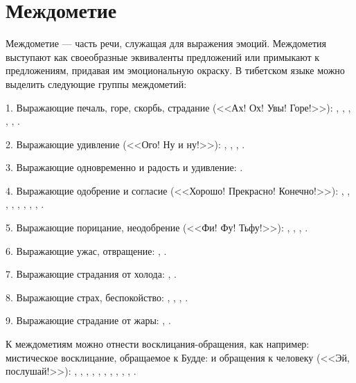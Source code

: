 \section{Междометие}

Междометие --- часть речи, служащая для выражения эмоций. Междометия выступают как своеобразные эквиваленты предложений или примыкают к предложениям, придавая им эмоциональную окраску. В тибетском языке можно выделить следующие группы междометий:

1. Выражающие печаль, горе, скорбь, страдание (<<Ах! Ох! Увы! Горе!>>):
,
,
,
,
,
.

2. Выражающие удивление (<<Ого! Ну и ну!>>):
,
,
,
.

3. Выражающие одновременно и радость и удивление: .

4. Выражающие одобрение и согласие (<<Хорошо! Прекрасно! Конечно!>>):
,
,
,
,
,
,
,
,
.

5. Выражающие порицание, неодобрение (<<Фи! Фу! Тьфу!>>):
,
,
,
.

6. Выражающие ужас, отвращение:
,
.

7. Выражающие страдания от холода:
,
.

8. Выражающие страх, беспокойство:
,
,
,
.

9. Выражающие страдание от жары:
,
.

К междометиям можно отнести восклицания-обращения, как например: мистическое восклицание, обращаемое к Будде:  и обращения к человеку (<<Эй, послушай!>>):
,
,
,
,
,
,
,
,
,
,
.
